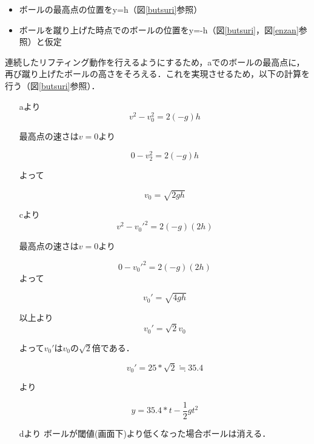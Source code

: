\vspace{1cm}


\begin{itemize}
    \item ボールの最高点の位置をy=h（図\ref{butsuri}参照）
    \item ボールを蹴り上げた時点でのボールの位置をy=-h（図\ref{butsuri}，図\ref{enzan}参照）と仮定
\end{itemize}


連続したリフティング動作を行えるようにするため，aでのボールの最高点に，
再び蹴り上げたボールの高さをそろえる．これを実現させるため，以下の計算を行う（図\ref{butsuri}参照）．


\begin{itemize}
    \item[aより]
        \begin{equation}
            v^2-v_0^2=2(-g)h
        \end{equation}

        最高点の速さは$v=0$より 

        \begin{equation}
            0-v_2^2=2(-g)h
        \end{equation}

        よって

        \begin{equation}
            v_0=\sqrt{2gh}
        \end{equation}

    \item[cより]
        \begin{equation}
            v^2-v_0'^2=2(-g)(2h)
        \end{equation}

        最高点の速さは$v=0$より 

        \begin{equation}
            0-v_0'^2=2(-g)(2h)
        \end{equation}
        よって

        \begin{equation}
            v_0'=\sqrt{4gh}
        \end{equation}

    \item[以上より]
        \begin{equation}
            v_0'=\sqrt{2}v_0
        \end{equation}

        よって$v_0'$は$v_0$の$\sqrt{2}$倍である． 

        \begin{equation}
            v_0'=25*\sqrt{2} \fallingdotseq 35.4 
        \end{equation}

        より

        \begin{equation}
            y=35.4*t-\frac{1}{2}gt^2
        \end{equation}

    \item[dより] ボールが閾値(画面下)より低くなった場合ボールは消える． 

\end{itemize}

